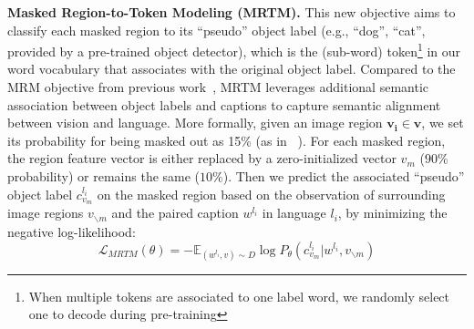 \documentclass[final]{cvpr}
\newcommand{\luowei}[1]{\textcolor{cyan}{\small{\bf [Luowei: #1 ]}}}
\newcommand{\jj}[1]{\textcolor{red}{\small{\bf [JJ: #1 ]}}}
\newcommand{\head}[1]{\noindent\textbf{#1}}
\begin{document}
\head{Masked Region-to-Token Modeling (MRTM).} This new objective aims to classify each masked region to its ``pseudo'' object label (e.g., ``dog'', ``cat'', provided by a pre-trained object detector), which is the (sub-word) token\footnote{When multiple tokens are associated to one label word, we randomly select one to decode during pre-training} in our word vocabulary that associates with the original object label.
Compared to the MRM objective from previous work~\cite{vilbert, unicodervl, UNITER}, MRTM leverages additional semantic association between object labels and captions to capture semantic alignment between vision and language. More formally, given an image region $\boldsymbol{v_i} \in \boldsymbol{v}$, we set its probability for being masked out as 15\% (as in ~\cite{BERT}). For each masked region, the region feature vector is either replaced by a zero-initialized vector $v_{m}$ ($90\%$ probability) or remains the same ($10\%$). Then we predict the associated ``pseudo'' object label $c_{v_m}^{l_i}$ on the masked region based on the observation of surrounding image regions $v_{\backslash m}$ and the paired caption $w^{l_i}$ in language $l_i$, by minimizing the negative log-likelihood:
\begin{equation*}
    \mathcal{L}_{MRTM}(\theta) = - \mathbb{E}_{(w^{l_i}, v)\sim D} \log{P_{\theta}(c_{v_m}^{l_i}|w^{l_i},v_{\backslash m})}
\end{equation*}

\end{document}
